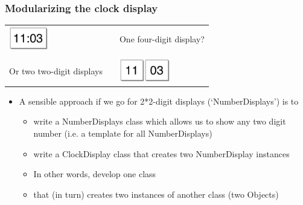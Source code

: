 \documentclass{beamer}
\begin{document}
\begin{frame}
\frametitle{Modularizing the clock display}
\begin{tabular}{lll}
\begin{minipage}{3cm}
\includegraphics[height=1cm,keepaspectratio]{./figures/cl1} \end{minipage} & \mbox{}\hspace{1cm} & One four-digit display?\\
\mbox{}\\
\begin{minipage}{3cm}
Or two two-digit displays
\end{minipage}& & \begin{minipage}{3cm}\includegraphics[height=1cm,keepaspectratio]{./figures/cl2}\includegraphics[height=1cm,keepaspectratio]{./figures/cl3}\end{minipage}
\end{tabular}
\end{frame}

\begin{frame}
\begin{itemize}
\item A sensible approach if we go for 2*2-digit displays (`NumberDisplays') is to 

\begin{itemize}
\item write a NumberDisplays class which allows us to show any two digit number (i.e. a template for all NumberDisplays)

\item write a ClockDisplay class that creates two NumberDisplay instances
\item In other words, develop one class 
\item that (in turn) creates two instances of another class (two Objects)
\end{itemize}
\end{itemize}
\end{frame}
\end{document}

